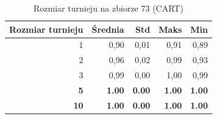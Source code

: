 \begin{table}[htbp]
\centering
\small
\setlength{\tabcolsep}{6pt}
\renewcommand{\arraystretch}{1.2}
\caption{Rozmiar turnieju na zbiorze 73 (CART)}
\label{tab:CART_tournament_size_73}
\begin{tabular}{r|r|r|r|r}
\toprule
Rozmiar turnieju & Średnia & Std & Maks & Min \\
\hline
1 & 0,90 & 0,01 & 0,91 & 0,89 \\
2 & 0,96 & 0,02 & 0,99 & 0,93 \\
3 & 0,99 & 0,00 & 1,00 & 0,99 \\
\textbf{5} & \textbf{1.00} & \textbf{0.00} & \textbf{1.00} & \textbf{1.00} \\
\textbf{10} & \textbf{1.00} & \textbf{0.00} & \textbf{1.00} & \textbf{1.00} \\
\bottomrule
\end{tabular}
\end{table}
